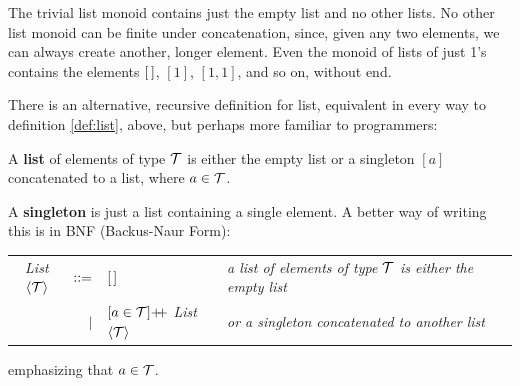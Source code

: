 The trivial list monoid contains just the empty list and no other lists. No other list monoid can be finite under concatenation, since, given any two elements, we can always create another, longer element. Even the monoid of lists of just 1's contains the elements $[\,]$, $[1]$, $[1,1]$, and so on, without end.


There is an alternative, recursive definition for list, equivalent in every way to definition \ref{def:list}, above, but perhaps more familiar to programmers:
\begin{definition}
  A \textbf{list} of elements of type $\mathcal{T}$ is either the empty list or a singleton $[a]$ concatenated to a list, where $a\in \mathcal{T}$.
  \label{def:recursivelist}
\end{definition}
A \textbf{singleton} is just a list containing a single element. A better way of writing this is in BNF (Backus-Naur Form):
\begin{center}
  \begin{tabular}{crll}
    \emph{List}$\langle \mathcal{T}\rangle$  &  $\mathrel{\mathop:}\mathrel{\mathop:}=$  &  $[\,]$
      & \emph{a list of elements of type $\mathcal{T}$ is either the empty list}\\
    \mbox{}  &  $\vert$  &  $[a\in\T]\pp$ \emph{List}$\langle \mathcal{T}\rangle$
      & \emph{or a singleton concatenated to another list}\\
  \end{tabular}
\end{center}
emphasizing that $a\in \mathcal{T}$.




